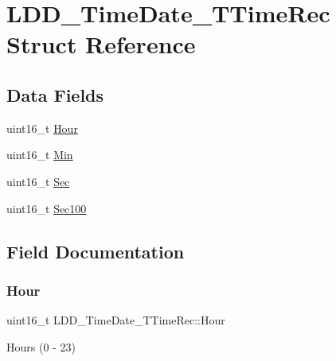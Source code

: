 \hypertarget{struct_l_d_d___time_date___t_time_rec}{}\section{L\+D\+D\+\_\+\+Time\+Date\+\_\+\+T\+Time\+Rec Struct Reference}
\label{struct_l_d_d___time_date___t_time_rec}
\subsection*{Data Fields}
\begin{DoxyCompactItemize}
\item 
uint16\+\_\+t \hyperlink{struct_l_d_d___time_date___t_time_rec_ac741c5c14148b2d360bb09fedc6ebabd}{Hour}
\item 
uint16\+\_\+t \hyperlink{struct_l_d_d___time_date___t_time_rec_a7cea2c409e90bccdc33f19b093020373}{Min}
\item 
uint16\+\_\+t \hyperlink{struct_l_d_d___time_date___t_time_rec_a05cccc86e89e5704b0460caaf2429f75}{Sec}
\item 
uint16\+\_\+t \hyperlink{struct_l_d_d___time_date___t_time_rec_a2cd2e13e7c478f04ea1c4c460b104491}{Sec100}
\end{DoxyCompactItemize}


\subsection{Field Documentation}
\mbox{\label{struct_l_d_d___time_date___t_time_rec_ac741c5c14148b2d360bb09fedc6ebabd}} 
\subsubsection{\texorpdfstring{Hour}{Hour}}
{\footnotesize\ttfamily uint16\+\_\+t L\+D\+D\+\_\+\+Time\+Date\+\_\+\+T\+Time\+Rec\+::\+Hour}

Hours (0 -\/ 23) \mbox{\label{struct_l_d_d___time_date___t_time_rec_a7cea2c409e90bccdc33f19b093020373}} 
